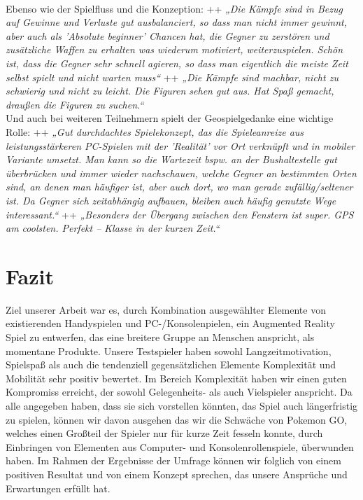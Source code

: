 \documentclass[extern,palatino]{cgBA}
\begin{document}
\\
Ebenso wie der Spielfluss und die Konzeption: ++ \textit{„Die Kämpfe sind in Bezug auf Gewinne und Verluste gut ausbalanciert, so dass man nicht immer gewinnt, aber auch als 'Absolute beginner' Chancen hat, die Gegner zu zerstören und zusätzliche Waffen zu erhalten was wiederum motiviert, weiterzuspielen. Schön ist, dass die Gegner sehr schnell agieren, so dass man eigentlich die meiste Zeit selbst spielt und nicht warten muss“} ++ \textit{„Die Kämpfe sind machbar, nicht zu schwierig und nicht zu leicht. Die Figuren sehen gut aus. Hat Spaß gemacht, draußen die Figuren zu suchen.“}
\\
Und auch bei weiteren Teilnehmern spielt der Geospielgedanke eine wichtige Rolle: ++ \textit{„Gut durchdachtes Spielekonzept, das die Spieleanreize aus leistungsstärkeren PC-Spielen mit der 'Realität' vor Ort verknüpft und in mobiler Variante umsetzt. Man kann so die Wartezeit bspw. an der Bushaltestelle gut überbrücken und immer wieder nachschauen, welche Gegner an bestimmten Orten sind, an denen man häufiger ist, aber auch dort, wo man gerade zufällig/seltener ist. Da Gegner sich zeitabhängig aufbauen, bleiben auch häufig genutzte Wege interessant.“} ++ \textit{„Besonders der Übergang zwischen den Fenstern ist super. GPS am coolsten. Perfekt – Klasse in der kurzen Zeit.“}

\section{Fazit}Ziel unserer Arbeit war es, durch Kombination ausgewählter Elemente von existierenden Handyspielen und PC-/Konsolenpielen, ein Augmented Reality Spiel zu entwerfen, das eine breitere Gruppe an Menschen anspricht, als momentane Produkte. Unsere Testspieler haben sowohl Langzeitmotivation, Spielspaß als auch die tendenziell gegensätzlichen Elemente Komplexität und Mobilität sehr positiv bewertet. Im Bereich Komplexität haben wir einen guten Kompromiss erreicht, der sowohl Gelegenheits- als auch Vielspieler anspricht. Da alle angegeben haben, dass sie sich vorstellen könnten, das Spiel auch längerfristig zu spielen, können wir davon ausgehen das wir die Schwäche von Pokemon GO, welches einen Großteil der Spieler nur für kurze Zeit fesseln konnte, durch Einbringen von Elementen aus Computer- und Konsolenrollenspiele, überwunden haben. Im Rahmen der Ergebnisse der Umfrage können wir folglich von einem positiven Resultat und von einem Konzept sprechen, das unsere Ansprüche und Erwartungen erfüllt hat.
\newpage
\end{document}
